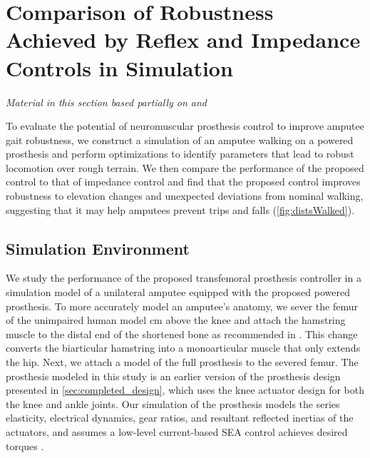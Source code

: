\section{Comparison of Robustness Achieved by Reflex and Impedance Controls in
    Simulation}\label{sec:completed_comparison}

\emph{Material in this section based partially on 
\citet{thatte2016toward}\cite{thatte2016toward} 
and \citet{thatte2014towards}\cite[0.25in]{thatte2014towards}}
\linebreak

To evaluate the potential of neuromuscular prosthesis control to improve amputee
gait robustness, we construct a simulation of an amputee walking on a powered
prosthesis and perform optimizations to identify parameters that lead to robust
locomotion over rough terrain. We then compare the performance of the proposed
control to that of impedance control and find that the proposed control improves
robustness to elevation changes and unexpected deviations from nominal walking,
suggesting that it may help amputees prevent trips and falls
(\cref{fig:distsWalked}).

\subsection{Simulation Environment}\label{sec:complete_simulation_environ}
We study the performance of the proposed transfemoral prosthesis controller in a
simulation model of a unilateral amputee equipped with the proposed powered
prosthesis. To more accurately model an amputee's anatomy, we sever the femur of
the unimpaired human model \unit[11]{cm} above the knee and attach the hamstring
muscle to the distal end of the shortened bone as recommended in
\citet{brown2012amputation}. This change converts the biarticular hamstring into
a monoarticular muscle that only extends the hip. Next, we attach a model of the
full prosthesis to the severed femur. The prosthesis modeled in this study is an
earlier version of the prosthesis design presented in
\cref{sec:completed_design}, which uses the knee actuator design for both the
knee and ankle joints. Our simulation of the prosthesis models the series
elasticity, electrical dynamics, gear ratios, and resultant reflected inertias
of the actuators, and assumes a low-level current-based SEA control achieves
desired torques \citep{pratt1995series}.

